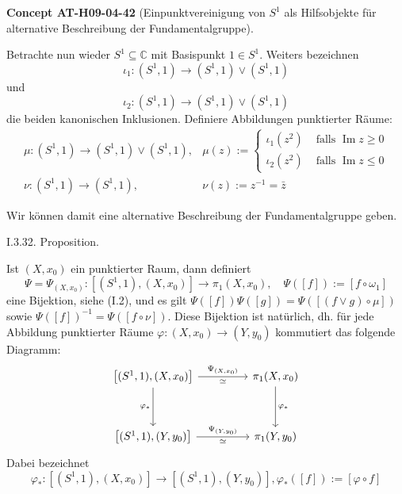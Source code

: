 \documentclass[10pt, letterpaper]{article}
\newcommand{\CustomHeading}[3]{%
  \par\medskip\noindent%
  \textbf{#1 #2} \textnormal{(#3)}.\enskip%
}
\newenvironment{CONC}[2]{\begin{unitbox}\CustomHeading{Concept}{#1}{#2}}{\end{unitbox}}
\begin{document}
\begin{CONC}{AT-H09-04-42}{Einpunktvereinigung von $S^1$ als Hilfsobjekte für alternative Beschreibung der Fundamentalgruppe}
Betrachte nun wieder $S^{1} \subseteq \mathbb{C}$ mit Basispunkt $1 \in S^{1}$. Weiters bezeichnen 
$$\iota_{1}:\left(S^{1}, 1\right) \rightarrow\left(S^{1}, 1\right) \vee\left(S^{1}, 1\right)$$ 
und 
$$\iota_{2}:\left(S^{1}, 1\right) \rightarrow\left(S^{1}, 1\right) \vee\left(S^{1}, 1\right)$$ 
die beiden kanonischen Inklusionen. Definiere Abbildungen punktierter Räume:
$$
\begin{array}{ll}
\mu:\left(S^{1}, 1\right) \rightarrow\left(S^{1}, 1\right) \vee\left(S^{1}, 1\right), & \mu(z):= \begin{cases}\iota_{1}\left(z^{2}\right) & \text { falls } \operatorname{Im} z \geq 0 \\
\iota_{2}\left(z^{2}\right) & \text { falls } \operatorname{Im} z \leq 0\end{cases} \\
\nu:\left(S^{1}, 1\right) \rightarrow\left(S^{1}, 1\right), & \nu(z):=z^{-1}=\bar{z}
\end{array}
$$
\end{CONC}




Wir können damit eine alternative Beschreibung der Fundamentalgruppe geben.



I.3.32. Proposition. 


Ist $(X, x_{0})$ ein punktierter Raum, dann definiert
$$
\Psi=\Psi_{\left(X, x_{0}\right)}:\left[\left(S^{1}, 1\right),\left(X, x_{0}\right)\right] \rightarrow \pi_{1}\left(X, x_{0}\right), \quad \Psi([f]):=\left[f \circ \omega_{1}\right]
$$
eine Bijektion, siehe (I.2), und es gilt $\Psi([f]) \Psi([g])=\Psi([(f \vee g) \circ \mu])$ sowie $\Psi([f])^{-1}=\Psi([f \circ \nu])$. Diese Bijektion ist natürlich, dh. für jede Abbildung punktierter Räume $\varphi:\left(X, x_{0}\right) \rightarrow\left(Y, y_{0}\right)$ kommutiert das folgende Diagramm:
\[
\begin{tikzcd}[row sep=3.5em, column sep=4.5em]
{\left[(S^1, 1), (X, x_0)\right]} \arrow[r, "\Psi_{(X,x_0)}", "\simeq"'] \arrow[d, "\varphi_*"'] &
\pi_1(X, x_0) \arrow[d, "\varphi_*"] \\
{\left[(S^1, 1), (Y, y_0)\right]} \arrow[r, "\Psi_{(Y,y_0)}", "\simeq"'] &
\pi_1(Y, y_0)
\end{tikzcd}
\]
Dabei bezeichnet 
$$\varphi_{*}:\left[\left(S^{1}, 1\right),\left(X, x_{0}\right)\right] \rightarrow\left[\left(S^{1}, 1\right),\left(Y, y_{0}\right)\right], \varphi_{*}([f]):=[\varphi \circ f]$$
\end{document}
